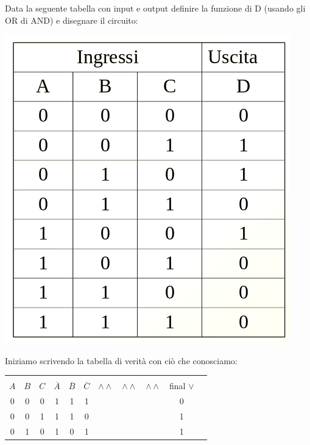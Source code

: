 \documentclass[a4paper,12pt, oneside]{book}
\begin{document}
\begin{esercizio}
  Data la seguente tabella con input e output definire la funzione di D (usando gli OR di AND) e disegnare il circuito:
  \begin{center}
    \includegraphics[scale=0.7]{img/es3.png}
  \end{center}
  Iniziamo scrivendo la tabella di verità con ciò che conosciamo:
  \begin{center}
    \begin{tabular}{|c|c|c|c|c|c|c|c|c|c|c|}
      \hline
      &     &     &                &                &                &                  &                  &                 &              \\
      $A$ & $B$ & $C$ & $\overline{A}$ & $\overline{B}$ & $\overline{C}$ & $\wedge \wedge $ & $\wedge \wedge $ & $\wedge \wedge$ & final $\vee$ \\
      \hline
      0   & 0   & 0   & 1              & 1              & 1              &                  &                  &                 & 0            \\
      \hline
      0   & 0   & 1   & 1              & 1              & 0              &                  &                  &                 & 1            \\
      \hline
      0   & 1   & 0   & 1              & 0              & 1              &                  &                  &                 & 1            \\

\end{tabular}
\end{center}
\end{esercizio}
\end{document}
